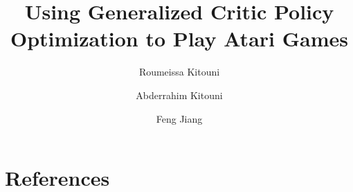 \documentclass[review]{elsarticle}
\begin{document}
\begin{frontmatter}

\title{Using Generalized Critic Policy Optimization to Play Atari Games}

\author[hbn]{Roumeissa Kitouni}

\author[cne]{Abderrahim Kitouni}

\author[hbn]{Feng Jiang}

\address[hbn]{Harbin Institute of Technology, 92 Xidazhi Street, Nangang District, Harbin City, Heilongjiang Province, China}
\address[cne]{Université frères Mentouri Constantine 1, route d'Ain El Bey, 25017 Constantine, Algeria}



\end{frontmatter}







%

%

%

\section*{References}


\end{document}
